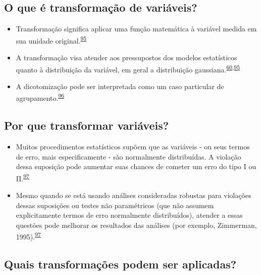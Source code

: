 \documentclass[
  a4paper,
]{book}
\begin{document}
\hypertarget{o-que-uxe9-transformauxe7uxe3o-de-variuxe1veis}{%
\subsection{O que é transformação de variáveis?}\label{o-que-uxe9-transformauxe7uxe3o-de-variuxe1veis}}

\begin{itemize}
\item
  Transformação significa aplicar uma função matemática à variável medida em sua unidade original.\textsuperscript{\protect\hyperlink{ref-Bland1996}{95}}
\item
  A transformação visa atender aos pressupostos dos modelos estatísticos quanto à distribuição da variável, em geral a distribuição gaussiana.\textsuperscript{\protect\hyperlink{ref-vetter2017}{60},\protect\hyperlink{ref-Bland1996}{95}}
\item
  A dicotomização pode ser interpretada como um caso particular de agrupamento.\textsuperscript{\protect\hyperlink{ref-Fedorov2009}{96}}
\end{itemize}

\hypertarget{por-que-transformar-variuxe1veis}{%
\subsection{Por que transformar variáveis?}\label{por-que-transformar-variuxe1veis}}

\begin{itemize}
\item
  Muitos procedimentos estatísticos supõem que as variáveis - ou seus termos de erro, mais especificamente - são normalmente distribuídas. A violação dessa suposição pode aumentar suas chances de cometer um erro do tipo I ou II.\textsuperscript{\protect\hyperlink{ref-osborne2010}{97}}
\item
  Mesmo quando se está usando análises consideradas robustas para violações dessas suposições ou testes não paramétricos (que não assumem explicitamente termos de erro normalmente distribuídos), atender a essas questões pode melhorar os resultados das análises (por exemplo, Zimmerman, 1995).\textsuperscript{\protect\hyperlink{ref-osborne2010}{97}}
\end{itemize}

\hypertarget{quais-transformauxe7uxf5es-podem-ser-aplicadas}{%
\subsection{Quais transformações podem ser aplicadas?}\label{quais-transformauxe7uxf5es-podem-ser-aplicadas}}
\end{document}
